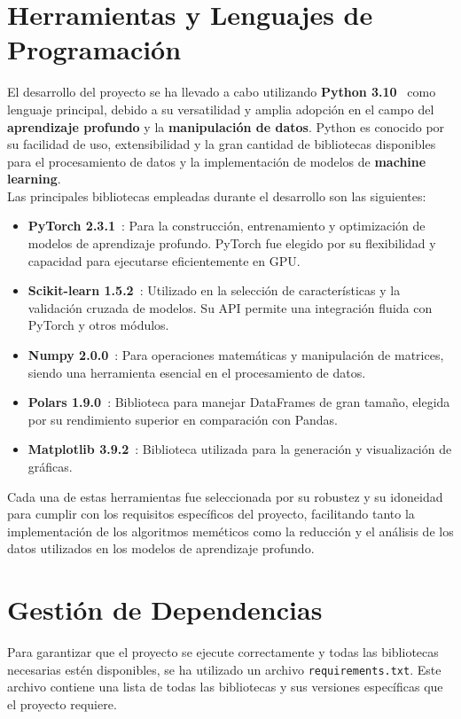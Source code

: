 \section{Herramientas y Lenguajes de Programación}\label{sec:herramientas-y-lenguajes-de-programacion}
El desarrollo del proyecto se ha llevado a cabo utilizando \textbf{Python 3.10}~\cite{} como lenguaje principal,
debido a su versatilidad y amplia adopción en el campo del \textbf{aprendizaje profundo} y la
\textbf{manipulación de datos}.
Python es conocido por su facilidad de uso, extensibilidad y la gran cantidad de bibliotecas disponibles para el
procesamiento de datos y la implementación de modelos de \textbf{machine learning}. \\[6pt]

Las principales bibliotecas empleadas durante el desarrollo son las siguientes:
\begin{itemize}
    \item \textbf{PyTorch 2.3.1}~\cite{}: Para la construcción, entrenamiento y optimización de modelos de aprendizaje
    profundo.
    PyTorch fue elegido por su flexibilidad y capacidad para ejecutarse eficientemente en GPU\@.
    \item \textbf{Scikit-learn 1.5.2}~\cite{}: Utilizado en la selección de características y la validación cruzada de
    modelos.
    Su API permite una integración fluida con PyTorch y otros módulos.
    \item \textbf{Numpy 2.0.0}~\cite{}: Para operaciones matemáticas y manipulación de matrices, siendo una herramienta
    esencial en el procesamiento de datos.
    \item \textbf{Polars 1.9.0}~\cite{}: Biblioteca para manejar DataFrames de gran tamaño, elegida por su rendimiento
    superior en comparación con Pandas.
    \item \textbf{Matplotlib 3.9.2}~\cite{}: Biblioteca utilizada para la generación y visualización de gráficas.
\end{itemize}

Cada una de estas herramientas fue seleccionada por su robustez y su idoneidad para cumplir con los requisitos
específicos del proyecto, facilitando tanto la implementación de los algoritmos meméticos como la reducción y el
análisis de los datos utilizados en los modelos de aprendizaje profundo. \\[6pt]

\section{Gestión de Dependencias}\label{sec:gestion-de-dependencias}
Para garantizar que el proyecto se ejecute correctamente y todas las bibliotecas necesarias estén disponibles, se ha
utilizado un archivo \texttt{requirements.txt}.
Este archivo contiene una lista de todas las bibliotecas y sus versiones específicas que el proyecto requiere. \\[6pt]

